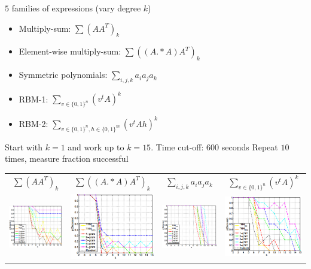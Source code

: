 \documentclass[landscape,a0b]{a0poster_csml_v2}
\begin{document}
\begin{poster}
\begin{PosterColumn}
$5$ families of expressions (vary degree $k$)
\begin{itemize}
  \item Multiply-sum: $\sum (AA^T)_k$
  \item Element-wise multiply-sum: $\sum ((A.* A)A^T)_k$
  \item Symmetric polynomials: $\sum_{i, j, k} a_ia_ja_k$
  \item RBM-1: $\sum_{v \in \{0, 1\}^n} (v^tA)^k$
  \item RBM-2: $\sum_{v \in \{0, 1\}^n, h \in \{0, 1\}^m} (v^tAh)^k$
\end{itemize}


Start with $k=1$ and work up to $k=15$.
Time cut-off: $600$ seconds
Repeat $10$ times, measure fraction successful
\\
\vspace{0.05cm}
\begin{minipage}[hc]{\textwidth}
  \centering
  \begin{center}
      \begin{tabular}{cccc}
        $\sum (AA^T)_k$ &
        $\sum ((A.* A)A^T)_k$ &
        $\sum_{i, j, k} a_ia_ja_k$ &
        $\sum_{v \in \{0, 1\}^n} (v^tA)^k$ \\
        \includegraphics[width=0.24\linewidth]{imgs/plot_aat.png} &
        \includegraphics[width=0.24\linewidth]{imgs/plot_aaa.png} &
        \includegraphics[width=0.24\linewidth]{imgs/plot_sym.png} &
        \includegraphics[width=0.24\linewidth]{imgs/plot_rbm1.png} \\

\end{tabular}
\end{center}
\end{minipage}
\end{PosterColumn}
\end{poster}
\end{document}

